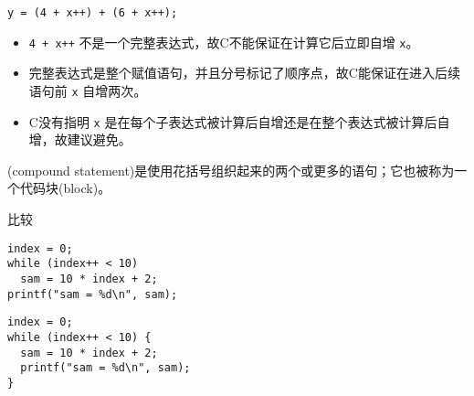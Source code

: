 \begin{frame}[fragile]

\begin{lstlisting}[frame=no]
y = (4 + x++) + (6 + x++);
\end{lstlisting}

\begin{itemize}
\item \lstinline|4 + x++| 不是一个完整表达式，故C不能保证在计算它后立即自增 \lstinline|x|。\\[0.1in] 
\item 完整表达式是整个赋值语句，并且分号标记了顺序点，故C能保证在进入后续语句前 \lstinline|x| 自增两次。\\[0.1in] 
\item C没有指明 \lstinline|x| 是在每个子表达式被计算后自增还是在整个表达式被计算后自增，故建议避免。

\end{itemize}

\end{frame}

\begin{frame}[fragile]
  \begin{dingyi}
    (compound statement)是使用花括号组织起来的两个或更多的语句；它也被称为一个代码块(block)。    
  \end{dingyi}

\end{frame}

\begin{frame}[fragile]
比较
\begin{lstlisting}[frame=no]
index = 0;
while (index++ < 10)
  sam = 10 * index + 2;
printf("sam = %d\n", sam);
\end{lstlisting}

\begin{lstlisting}[frame=no]
index = 0;
while (index++ < 10) {
  sam = 10 * index + 2;
  printf("sam = %d\n", sam);
}
\end{lstlisting}
\end{frame}
